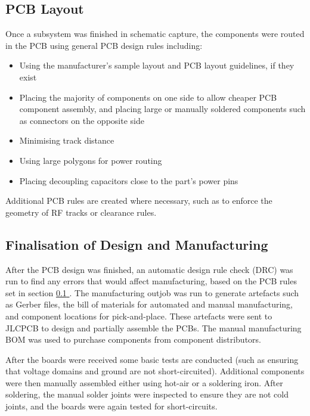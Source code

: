 \documentclass{report}
\newcommand*{\secref}[1]{section \hyperref[{#1}]{\ref*{#1} \nameref*{#1}}}
\begin{document}
\subsection{PCB Layout}
\label{sec:pcb-layout}

Once a subsystem was finished in schematic capture, the components were routed in the PCB using general PCB design rules including:

\begin{itemize}
  \item Using the manufacturer's sample layout and PCB layout guidelines, if they exist
  \item Placing the majority of components on one side to allow cheaper PCB component assembly, and placing large or manually soldered components such as connectors on the opposite side
  \item Minimising track distance
  \item Using large polygons for power routing
  \item Placing decoupling capacitors close to the part's power pins
\end{itemize}

Additional PCB rules are created where necessary, such as to enforce the geometry of RF tracks or clearance rules.

\subsection{Finalisation of Design and Manufacturing}

After the PCB design was finished, an automatic design rule check (DRC) was run to find any errors that would affect manufacturing, based on the PCB rules set in \secref{sec:pcb-layout}. The manufacturing outjob was run to generate artefacts such as Gerber files, the bill of materials for automated and manual manufacturing, and component locations for pick-and-place. These artefacts were sent to JLCPCB to design and partially assemble the PCBs. The manual manufacturing BOM was used to purchase components from component distributors.

After the boards were received some basic tests are conducted (such as ensuring that voltage domains and ground are not short-circuited). Additional components were then manually assembled either using hot-air or a soldering iron. After soldering, the manual solder joints were inspected to ensure they are not cold joints, and the boards were again tested for short-circuits.
\end{document}
